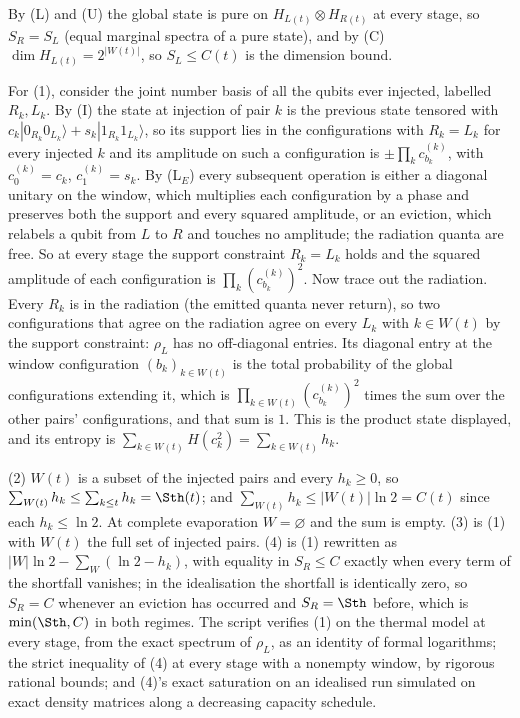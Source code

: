 By (L) and (U) the global state is pure on $H_{L(t)} \otimes H_{R(t)}$ at every stage, so $S_R = S_L$ (equal marginal spectra of a pure state), and by (C) $\dim H_{L(t)} = 2^{|W(t)|}$, so $S_L \leq C(t)$ is the dimension bound.

For (1), consider the joint number basis of all the qubits ever injected, labelled $R_k, L_k$. By (I) the state at injection of pair $k$ is the previous state tensored with $c_k|0_{R_k}0_{L_k}\rangle + s_k|1_{R_k}1_{L_k}\rangle$, so its support lies in the configurations with $R_k = L_k$ for every injected $k$ and its amplitude on such a configuration is $\pm\prod_k c^{(k)}_{b_k}$, with $c^{(k)}_0 = c_k$, $c^{(k)}_1 = s_k$. By (L$_E$) every subsequent operation is either a diagonal unitary on the window, which multiplies each configuration by a phase and preserves both the support and every squared amplitude, or an eviction, which relabels a qubit from $L$ to $R$ and touches no amplitude; the radiation quanta are free. So at every stage the support constraint $R_k = L_k$ holds and the squared amplitude of each configuration is $\prod_k (c^{(k)}_{b_k})^{2}$. Now trace out the radiation. Every $R_k$ is in the radiation (the emitted quanta never return), so two configurations that agree on the radiation agree on every $L_k$ with $k \in W(t)$ by the support constraint: $\rho_L$ has no off-diagonal entries. Its diagonal entry at the window configuration $(b_k)_{k \in W(t)}$ is the total probability of the global configurations extending it, which is $\prod_{k \in W(t)}(c^{(k)}_{b_k})^{2}$ times the sum over the other pairs' configurations, and that sum is $1$. This is the product state displayed, and its entropy is $\sum_{k \in W(t)} H(c_k^{2}) = \sum_{k \in W(t)} h_k$.

(2) $W(t)$ is a subset of the injected pairs and every $h_k \geq 0$, so $\sum_{W(t)} h_k \leq \sum_{k \leq t} h_k = \Sth(t)$; and $\sum_{W(t)} h_k \leq |W(t)|\ln 2 = C(t)$ since each $h_k \leq \ln 2$. At complete evaporation $W = \varnothing$ and the sum is empty. (3) is (1) with $W(t)$ the full set of injected pairs. (4) is (1) rewritten as $|W|\ln 2 - \sum_{W}(\ln 2 - h_k)$, with equality in $S_R \leq C$ exactly when every term of the shortfall vanishes; in the idealisation the shortfall is identically zero, so $S_R = C$ whenever an eviction has occurred and $S_R = \Sth$ before, which is $\min(\Sth, C)$ in both regimes. The script verifies (1) on the thermal model at every stage, from the exact spectrum of $\rho_L$, as an identity of formal logarithms; the strict inequality of (4) at every stage with a nonempty window, by rigorous rational bounds; and (4)'s exact saturation on an idealised run simulated on exact density matrices along a decreasing capacity schedule.

